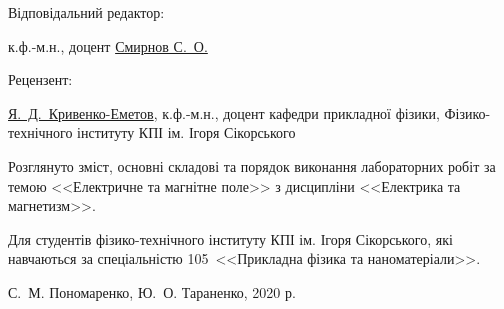 {\begin{alwayssingle}
        \vspace*{2em}
		\noindent%
        \begin{minipage}[t]{0.2\linewidth}
            	\begin{flushleft}
                    Відповідальний редактор:
                \end{flushleft}
        \end{minipage}\hfill
        \begin{minipage}[t]{0.78\linewidth}
                к.ф.-м.н., доцент \href{http://ipt.kpi.ua/smirnov}{Смирнов С.~О.}
        \end{minipage}

        \vspace*{2em}
		\noindent%
        \begin{minipage}[t]{0.2\linewidth}
            	\begin{flushleft}
                    Рецензент:
                \end{flushleft}
        \end{minipage}\hfill
        \begin{minipage}[t]{0.78\linewidth}
                \href{http://apd.ipt.kpi.ua/blog/author/19}{Я.~Д.~Кривенко-Еметов}, к.ф.-м.н., доцент кафедри прикладної фізики, Фізико-технічного інституту КПІ ім. Ігоря Сікорського
        \end{minipage}

        \vfill

		Розглянуто зміст, основні складові та порядок виконання лабораторних робіт за темою <<Електричне та магнітне поле>> з дисципліни <<Електрика та магнетизм>>. 

		Для студентів фізико-технічного інституту КПІ ім. Ігоря Сікорського, які навчаються за спеціальністю 105~<<Прикладна фізика та наноматеріали>>.
		
		\vfill
				
	\begin{flushright}
        \textcopyright{} С.~М. Пономаренко, Ю.~О. Тараненко, 2020 р.
    \end{flushright}
		\newpage%
	\end{alwayssingle}
}

